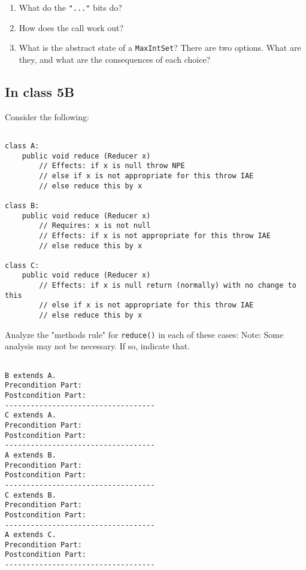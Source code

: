 \documentclass[11pt]{article}
\begin{document}
\begin{enumerate}
\item What do the \texttt{"..."} bits do?
\item How does the call work out?
\item What is the abstract state of a \texttt{MaxIntSet}? There are two options. What are they, and what are the consequences of each choice?
\end{enumerate}

\subsection{In class 5B}
\label{sec:orgfe7ef1b}
Consider the following:

\begin{verbatim}

class A:
    public void reduce (Reducer x)    
        // Effects: if x is null throw NPE 
        // else if x is not appropriate for this throw IAE
        // else reduce this by x

class B:
    public void reduce (Reducer x) 
        // Requires: x is not null
        // Effects: if x is not appropriate for this throw IAE
        // else reduce this by x

class C:
    public void reduce (Reducer x)   
        // Effects: if x is null return (normally) with no change to this
        // else if x is not appropriate for this throw IAE
        // else reduce this by x
\end{verbatim}

Analyze the "methods rule" for \texttt{reduce()} in each of these cases: Note: Some analysis may not be necessary. If so, indicate that.

\begin{verbatim}

B extends A.
Precondition Part:
Postcondition Part:
-----------------------------------          
C extends A.
Precondition Part:
Postcondition Part:
-----------------------------------          
A extends B.
Precondition Part:
Postcondition Part:
-----------------------------------          
C extends B.
Precondition Part:
Postcondition Part:
-----------------------------------                    
A extends C.
Precondition Part:
Postcondition Part: 
-----------------------------------          
\end{verbatim}
\end{document}
